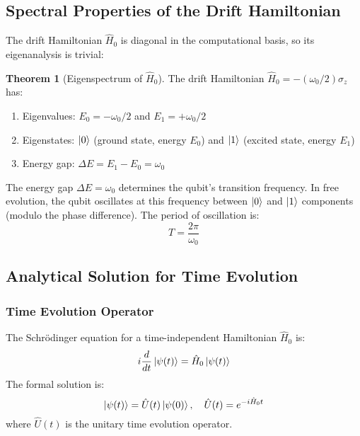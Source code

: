 \documentclass[11pt,a4paper]{article}
\theoremstyle{definition}
\newtheorem{theorem}{Theorem}[section]
\theoremstyle{remark}
\begin{document}
\subsection{Spectral Properties of the Drift Hamiltonian}

The drift Hamiltonian $\hat{H}_0$ is diagonal in the computational basis, so its eigenanalysis is trivial:

\begin{theorem}[Eigenspectrum of $\hat{H}_0$]
The drift Hamiltonian $\hat{H}_0 = -(\omega_0/2) \sigma_z$ has:
\begin{enumerate}[label=(\roman*)]
    \item Eigenvalues: $E_0 = -\omega_0/2$ and $E_1 = +\omega_0/2$
    \item Eigenstates: $\ket{0}$ (ground state, energy $E_0$) and $\ket{1}$ (excited state, energy $E_1$)
    \item Energy gap: $\Delta E = E_1 - E_0 = \omega_0$
\end{enumerate}
\end{theorem}

The energy gap $\Delta E = \omega_0$ determines the qubit's transition frequency. In free evolution, the qubit oscillates at this frequency between $\ket{0}$ and $\ket{1}$ components (modulo the phase difference). The period of oscillation is:
\begin{equation}
T = \frac{2\pi}{\omega_0}
\label{eq:period}
\end{equation}

\subsection{Analytical Solution for Time Evolution}

\subsubsection{Time Evolution Operator}

The Schrödinger equation for a time-independent Hamiltonian $\hat{H}_0$ is:
\begin{equation}
i \frac{d}{dt} \ket{\psi(t)} = \hat{H}_0 \ket{\psi(t)}
\end{equation}
The formal solution is:
\begin{equation}
\ket{\psi(t)} = \hat{U}(t) \ket{\psi(0)}, \quad \hat{U}(t) = e^{-i \hat{H}_0 t}
\end{equation}
where $\hat{U}(t)$ is the unitary time evolution operator.
\end{document}
